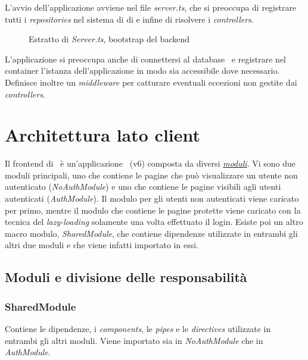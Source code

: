 L'avvio dell'applicazione avviene nel file \textit{server.ts}, che si preoccupa di registrare tutti i \textit{repositories} nel sistema di \acrlong{di} e infine di risolvere i \textit{controllers}.
\begin{figure}[H] 
	\centering    
	
	\caption[Estratto di \textit{Server.ts}, bootstrap del \gls{backend}]{Estratto di \textit{Server.ts}, bootstrap del \gls{backend}}
	\label{fig:server-bootstrap}
\end{figure}

\noindent
L'applicazione si preoccupa anche di connettersi al database \mongodb~e registrare nel container l'istanza dell'applicazione in modo sia accessibile dove necessario. Definisce inoltre un \textit{middleware} per catturare eventuali eccezioni non gestite dai \textit{controllers}.

\pagebreak
\section{Architettura lato client}

Il \gls{frontend} di \projectName~è un'applicazione \angular~(v6) composta da diversi \hyperref[chap:ngmodules]{\textit{moduli}}. Vi sono due moduli principali, uno che contiene le pagine che può visualizzare un utente non autenticato (\textit{NoAuthModule}) e uno che contiene le pagine visibili agli utenti autenticati (\textit{AuthModule}). Il modulo per gli utenti non autenticati viene caricato per primo, mentre il modulo che contiene le pagine protette viene caricato con la tecnica del \textit{lazy-loading} solamente una volta effettuato il login. Esiste poi un altro macro modulo, \textit{SharedModule}, che contiene dipendenze utilizzate in entrambi gli altri due moduli e che viene infatti importato in essi.

\subsection{Moduli e divisione delle responsabilità}
\label{client:modules}
\subsubsection{SharedModule}
\label{client:shared-module}
Contiene le dipendenze, i \textit{components}, le \textit{pipes} e le \textit{directives} utilizzate in entrambi gli altri moduli. Viene importato sia in \textit{NoAuthModule} che in \textit{AuthModule}.

